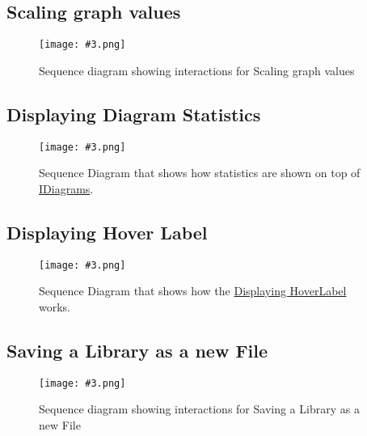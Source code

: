 \documentclass[10pt,a4paper]{report}
\newcommand{\refer}[2]{\hyperref[#1]{\textcolor{col:reference}{#2}}}
\newcommand{\includeimage}[5]{
    \begin{figure}[H]
        #1
        \texttt{[image: \#3.png]}
        \caption{#4}
        \label{fig:#5}
    \end{figure}
}
\newcommand{\packagebeginning}{edu.kit.informatik.pse.gelf} %
\newcommand{\lblroot}{lbl} %
\newcommand{\lblpackage}{} %
\newcommand{\lblpackageelement}{} %
\newcommand{\lblpackageelementmember}{} %
\newcommand{\lblpackageelementmemberparameter}{} %
\newcommand{\casclabelname}{\lblroot\lblpackage\lblpackageelement\lblpackageelementmember\lblpackageelementmemberparameter}
\newcommand{\casclabel}{\label{\casclabelname}}
\begin{document}
\subsection{Scaling graph values}
\includeimage{}{0.35}{scalingvalues}{Sequence diagram showing interactions for Scaling graph values}{Scaling Values}
\subsection{Displaying Diagram Statistics}
\includeimage{}{0.30}{DiagramStatistics}{Sequence Diagram that shows how statistics are shown on top of \refer{\lblroot:view.diagrams:IDiagram}{IDiagrams}.}{Displaying Diagram Statistics}
\subsection{Displaying Hover Label}
\includeimage{}{0.35}{HoverLabelDiagram}{Sequence Diagram that shows how the \refer{\lblroot:view.diagrams.components:HoverLabel}{Displaying HoverLabel} works.}{Hover Label}
\subsection{Saving a Library as a new File} %
\includeimage{}{0.35}{FR-21}{Sequence diagram showing interactions for Saving a Library as a new File}{Saving a Library as a new File}
\end{document}
